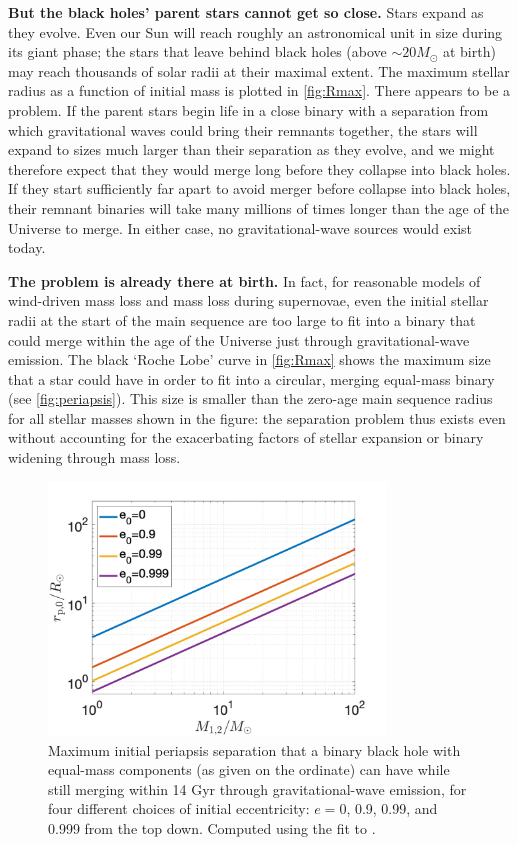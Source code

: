 \documentclass[review]{elsarticle}
\begin{document}
\textbf{But the black holes' parent stars cannot get so close.} Stars expand as they evolve. Even our Sun will reach roughly an astronomical unit in size during its giant phase; the stars that leave behind black holes (above $\sim 20 M_\odot$  at birth) may reach thousands of solar radii at their maximal extent. The maximum stellar radius as a function of initial mass is plotted in \autoref{fig:Rmax}. There appears to be a problem. If the parent stars begin life in a close binary with a separation from which gravitational waves could bring their remnants together, the stars will expand to sizes much larger than their separation as they evolve, and we might therefore expect that they would merge long before they collapse into black holes. If they start sufficiently far apart to avoid merger before collapse into black holes, their remnant binaries will take many millions of times longer than the age of the Universe to merge. In either case, no gravitational-wave sources would exist today. 

\textbf{The problem is already there at birth.} In fact, for reasonable models of wind-driven mass loss and mass loss during supernovae, even the initial stellar radii at the start of the main sequence are too large to fit into a binary that could merge within the age of the Universe just through gravitational-wave emission.  The black `Roche Lobe' curve in \autoref{fig:Rmax} shows the maximum size that a star could have in order to fit into a circular, merging equal-mass binary (see \autoref{fig:periapsis}).  This size is smaller than the zero-age main sequence radius for all stellar masses shown in the figure: the separation problem thus exists even without accounting for the exacerbating factors of stellar expansion or binary widening through mass loss.


\begin{figure}
	\centering
	\includegraphics[width=0.8\textwidth]{M-rp-log.png}
	\caption{Maximum initial periapsis separation that a binary black hole with equal-mass components (as given on the ordinate) can have while still merging within 14 Gyr through gravitational-wave emission, for four different choices of initial eccentricity: $e=0$, 0.9, 0.99, and 0.999 from the top down.  Computed using the \citet{Mandel:2021} fit to \citet{Peters:1964}. \label{fig:periapsis}}
\end{figure}
	
\end{document}
